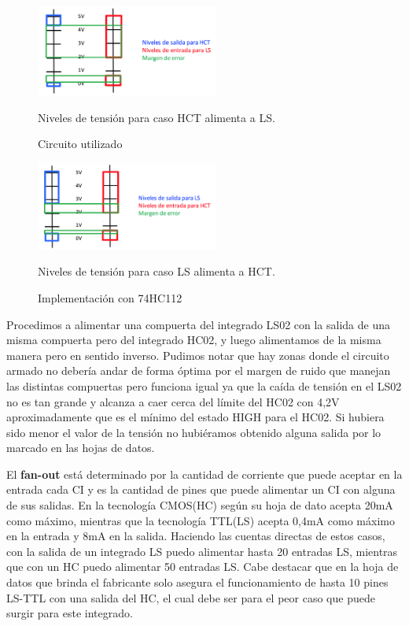 \begin{figure}[H]
\begin{center}
  \begin{minipage}[b]{0.4\textwidth}
  	\begin{center}
  		\includegraphics[width=6cm]{ejercicio2/HCT-LS}
    \caption{Niveles de tensi\'on para caso HCT alimenta a LS.} %
  	\end{center}
  \caption{Circuito utilizado}
  \label{7_fig1}
  \end{minipage}
  \begin{minipage}[b]{0.4\textwidth}
    \begin{center}
  		\includegraphics[width=6cm]{ejercicio2/LS-HCT}
    \caption{Niveles de tensi\'on para caso LS alimenta a HCT.} %
	\end{center}
  \caption{Implementaci\'on con 74HC112}
  \label{7_fig2}
 \end{minipage}
\end{center}
\end{figure}


Procedimos a alimentar una compuerta del integrado LS02 con la salida de una misma compuerta pero del integrado HC02, y luego alimentamos de la misma manera pero en sentido inverso. Pudimos notar que hay zonas donde el circuito armado no deber\'ia andar de forma \'optima por el margen de ruido que manejan las distintas compuertas pero funciona igual ya que la ca\'ida de tensi\'on en el LS02 no es tan grande y alcanza a caer cerca del l\'imite del HC02 con 4,2V aproximadamente que es el m\'inimo del estado HIGH para el HC02. Si hubiera sido menor el valor de la tensi\'on no hubi\'eramos obtenido alguna salida por lo marcado en las hojas de datos.
\newline

El \textbf{fan-out} est\'a determinado por la cantidad de corriente que puede aceptar en la entrada cada CI y es la cantidad de pines que puede alimentar un CI con alguna de sus salidas. En la tecnolog\'ia CMOS(HC) seg\'un su hoja de dato acepta 20mA como m\'aximo, mientras que la tecnolog\'ia TTL(LS) acepta 0,4mA como m\'aximo en la entrada y 8mA en la salida. Haciendo las cuentas directas de estos casos, con la salida de un integrado LS puedo alimentar hasta 20 entradas LS, mientras que con un HC puedo alimentar 50 entradas LS. Cabe destacar que en la hoja de datos que brinda el fabricante solo asegura el funcionamiento de hasta 10 pines LS-TTL con una salida del HC, el cual debe ser para el peor caso que puede surgir para este integrado.
\newline

